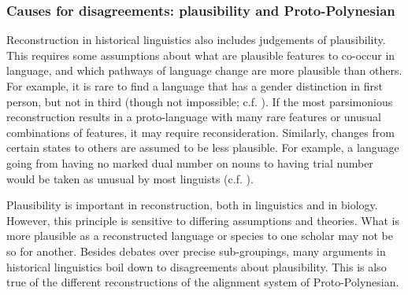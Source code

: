 \documentclass[a4paper,10pt]{article} %
\begin{document}




\subsubsection{Causes for disagreements: plausibility and Proto-Polynesian}
Reconstruction in historical linguistics also includes judgements of plausibility. This requires some assumptions about what are plausible features to co-occur in language, and which pathways of language change are more plausible than others. For example, it is rare to find a language that has a gender distinction in first person, but not in third (though not impossible; c.f. \citet{wals-44}). If the most parsimonious reconstruction results in a proto-language with many rare features or unusual combinations of features, it may require reconsideration. Similarly, changes from certain states to others are assumed to be less plausible. For example, a language going from having no marked dual number on nouns to having trial number would be taken as unusual by most linguists (c.f. \citet[8]{kikusawa_2006_pro_number}). 

Plausibility is important in reconstruction, both in linguistics and in biology. However, this principle is sensitive to differing assumptions and theories. What is more plausible as a reconstructed language or species to one scholar may not be so for another. Besides debates over precise sub-groupings, many arguments in historical linguistics boil down to disagreements about plausibility. This is also true of the different reconstructions of the alignment system of Proto-Polynesian.
\end{document}
